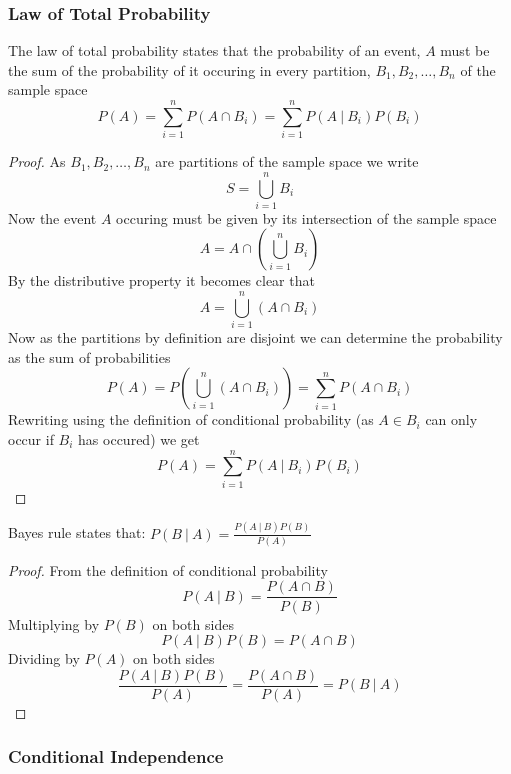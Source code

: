 \subsubsection{Law of Total Probability}
The law of total probability states that the probability of an event, $A$ must be the sum of the probability of it occuring in every partition, $B_{1},B_{2},\ldots,B_{n}$ of the sample space
\[
    P(A)=\sum_{i=1}^{n}P(A\cap B_{i})=\sum_{i=1}^{n}P(A~|~B_{i})P(B_{i})
\]
\begin{proof}
  As $B_{1},B_{2},\ldots,B_{n}$ are partitions of the sample space we write
  \[
      S=\bigcup_{i=1}^{n} B_{i}
  \]
  Now the event $A$ occuring must be given by its intersection of the sample space
  \[
      A=A\cap\left(\bigcup_{i=1}^{n} B_{i}\right)
  \]
  By the distributive property it becomes clear that
  \[
      A=\bigcup_{i=1}^{n} (A\cap B_{i})
  \]
  Now as the partitions by definition are disjoint we can determine the probability as the sum of probabilities
  \[
      P(A)=P\left(\bigcup_{i=1}^{n} (A\cap B_{i})\right)=\sum_{i=1}^{n}P(A\cap B_{i})
  \]
  Rewriting using the definition of conditional probability (as $A\in B_{i}$ can only occur if $B_{i}$ has occured) we get
  \[
      P(A)=\sum_{i=1}^{n}P(A~|~B_{i})P(B_{i})
  \]
\end{proof}
\begin{theorem}
  Bayes rule states that: $P(B~|~A)=\frac{P(A~|~B)P(B)}{P(A)}$
\end{theorem}
\begin{proof}
  From the definition of conditional probability
  \[
      P(A~|~B)=\frac{P(A\cap B)}{P(B)}
  \]
  Multiplying by $P(B)$ on both sides
  \[
      P(A~|~B)P(B)=P(A\cap B)
  \]
  Dividing by $P(A)$ on both sides
  \[
      \frac{P(A~|~B)P(B)}{P(A)}=\frac{P(A\cap B)}{P(A)}=P(B~|~A)
  \]
\end{proof}
\subsubsection{Conditional Independence}

